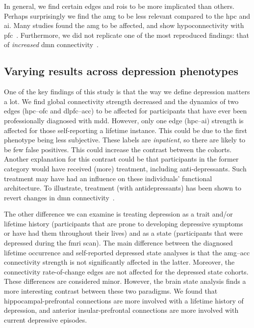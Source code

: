 In general, we find certain edges and \glspl{roi} to be more implicated than others.
Perhaps surprisingly we find the \gls{amg} to be less relevant compared to the \gls{hpc} and \gls{ai}.
Many studies found the \gls{amg} to be affected, and show hypoconnectivity with \gls{pfc}~\parencite{Dannlowski2009, Burghy2012, Kong2013, Connolly2017}.
Furthermore, we did not replicate one of the most reproduced findings: that of \emph{increased} \gls{dmn} connectivity~\parencite{Kaiser2015, Kaiser2015b, Mulders2015, Kaiser2016}.

\subsection{Varying results across depression phenotypes}\label{subsec:variation-depression-phenotypes}

One of the key findings of this study is that the way we define depression matters a lot.
We find global connectivity strength decreased and the dynamics of two edges (\gls{hpc}--\gls{ofc} and \gls{dlpfc}--\gls{acc}) to be affected for participants that have ever been professionally diagnosed with \gls{mdd}.
However, only one edge (\gls{hpc}--\gls{ai}) strength is affected for those self-reporting a lifetime instance.
This could be due to the first phenotype being less subjective.
These labels are \emph{inpatient}, so there are likely to be few false positives.
This could increase the contrast between the cohorts.
%
Another explanation for this contrast could be that participants in the former category would have received (more) treatment, including anti-depressants.
Such treatment may have had an influence on these individuals' functional architecture.
To illustrate, treatment (with antidepressants) has been shown to revert changes in \gls{dmn} connectivity~\parencite{Liston2014}.

The other difference we can examine is treating depression as a trait and/or lifetime history (participants that are prone to developing depressive symptoms or have had them throughout their lives) and as a state (participants that were depressed during the \gls{fmri} scan).
The main difference between the diagnosed lifetime occurrence and self-reported depressed state analyses is that the \gls{amg}--\gls{acc} connectivity strength is not significantly affected in the latter.
Moreover, the connectivity rate-of-change edges are not affected for the depressed state cohorts.
These differences are considered minor.
However, the brain state analysis finds a more interesting contrast between these two paradigms.
We found that hippocampal-prefrontal connections are more involved with a lifetime history of depression, and anterior insular-prefrontal connections are more involved with current depressive episodes.

